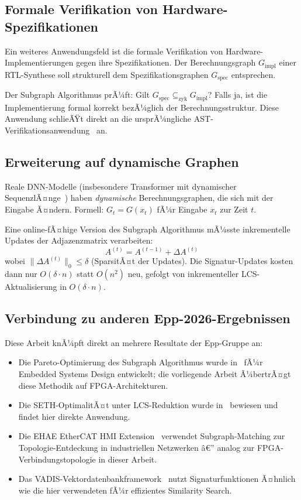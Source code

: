 ﻿\documentclass[a4paper,12pt]{article}
\theoremstyle{definition}
\begin{document}
\subsection{Formale Verifikation von Hardware-Spezifikationen}

Ein weiteres Anwendungsfeld ist die formale Verifikation von Hardware-Implementierungen
gegen ihre Spezifikationen. Der Berechnungsgraph $G_{\text{impl}}$ einer RTL-Synthese
soll strukturell dem Spezifikationsgraphen $G_{\text{spec}}$ entsprechen.

Der Subgraph Algorithmus prÃ¼ft: Gilt $G_{\text{spec}} \subseteq_{\text{zyk}} G_{\text{impl}}$?
Falls ja, ist die Implementierung formal korrekt bezÃ¼glich der Berechnungsstruktur.
Diese Anwendung schlieÃŸt direkt an die ursprÃ¼ngliche AST-Verifikationsanwendung~\cite{epp2026a} an.

\subsection{Erweiterung auf dynamische Graphen}

Reale DNN-Modelle (insbesondere Transformer mit dynamischer SequenzlÃ¤nge~\cite{jentzsch2025})
haben \emph{dynamische} Berechnungsgraphen, die sich mit der Eingabe Ã¤ndern.
Formell: $G_t = G(x_t)$ fÃ¼r Eingabe $x_t$ zur Zeit $t$.

Eine online-fÃ¤hige Version des Subgraph Algorithmus mÃ¼sste inkrementelle Updates
der Adjazenzmatrix verarbeiten:
\[
    A^{(t)} = A^{(t-1)} + \Delta A^{(t)}
\]
wobei $\|\Delta A^{(t)}\|_0 \leq \delta$ (SparsitÃ¤t der Updates).
Die Signatur-Updates kosten dann nur $O(\delta \cdot n)$ statt $O(n^2)$ neu,
gefolgt von inkrementeller LCS-Aktualisierung in $O(\delta \cdot n)$.

\subsection{Verbindung zu anderen Epp-2026-Ergebnissen}

Diese Arbeit knÃ¼pft direkt an mehrere Resultate der Epp-Gruppe an:
\begin{itemize}
    \item Die Pareto-Optimierung des Subgraph Algorithmus wurde in~\cite{epp2026d}
          fÃ¼r Embedded Systems Design entwickelt; die vorliegende Arbeit Ã¼bertrÃ¤gt
          diese Methodik auf FPGA-Architekturen.
    \item Die SETH-OptimalitÃ¤t unter LCS-Reduktion wurde in~\cite{epp2026b} bewiesen
          und findet hier direkte Anwendung.
    \item Die EHAE EtherCAT HMI Extension~\cite{epp2026e} verwendet Subgraph-Matching
          zur Topologie-Entdeckung in industriellen Netzwerken â€” analog zur
          FPGA-Verbindungstopologie in dieser Arbeit.
    \item Das VADIS-Vektordatenbankframework~\cite{epp2026f} nutzt Signaturfunktionen
          Ã¤hnlich wie die hier verwendeten fÃ¼r effizientes Similarity Search.
\end{itemize}
\end{document}
